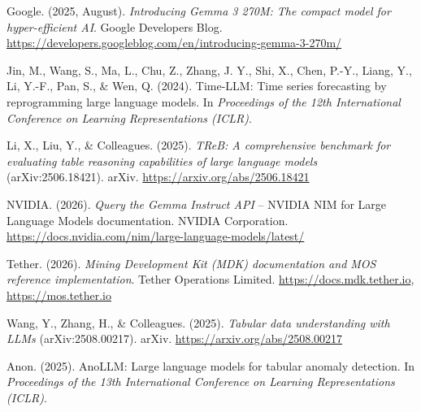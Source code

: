 \documentclass[11pt,a4paper]{article}
\begin{document}
Google. (2025, August). \emph{Introducing Gemma 3 270M: The compact model
for hyper-efficient AI}. Google Developers Blog.
\url{https://developers.googleblog.com/en/introducing-gemma-3-270m/}

Jin, M., Wang, S., Ma, L., Chu, Z., Zhang, J. Y., Shi, X., Chen, P.-Y.,
Liang, Y., Li, Y.-F., Pan, S., \& Wen, Q. (2024). Time-LLM: Time series
forecasting by reprogramming large language models. In \emph{Proceedings of
the 12th International Conference on Learning Representations (ICLR)}.

Li, X., Liu, Y., \& Colleagues. (2025). \emph{TReB: A comprehensive
benchmark for evaluating table reasoning capabilities of large language
models} (arXiv:2506.18421). arXiv. \url{https://arxiv.org/abs/2506.18421}

NVIDIA. (2026). \emph{Query the Gemma Instruct API} -- NVIDIA NIM for
Large Language Models documentation. NVIDIA Corporation.
\url{https://docs.nvidia.com/nim/large-language-models/latest/}

Tether. (2026). \emph{Mining Development Kit (MDK) documentation and MOS
reference implementation}. Tether Operations Limited.
\url{https://docs.mdk.tether.io}, \url{https://mos.tether.io}

Wang, Y., Zhang, H., \& Colleagues. (2025). \emph{Tabular data
understanding with LLMs} (arXiv:2508.00217). arXiv.
\url{https://arxiv.org/abs/2508.00217}

Anon. (2025). AnoLLM: Large language models for tabular anomaly detection.
In \emph{Proceedings of the 13th International Conference on Learning
Representations (ICLR)}.

\endgroup
\end{document}
